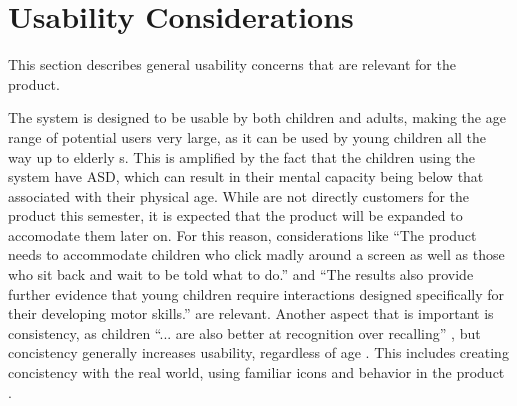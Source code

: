 \section{Usability Considerations}
\label{Preanalysis:Usability_for_children}
This section describes general usability concerns that are relevant for the product. \newline

The \giraf[] system is designed to be usable by both children and adults, making the age range of potential users very large, as it can be used by young children all the way up to elderly \guardian[]s. 
This is amplified by the fact that the children using the system have ASD, which can result in their mental capacity being below that associated with their physical age. \newline
While \autists[] are not directly customers for the product this semester, it is expected that the product will be expanded to accomodate them later on. 
For this reason, considerations like "`The product needs to accommodate children who click madly around a screen as well as those who sit back and wait to be told what to do."' \citep{microsoft:usability} and "`The results also provide further evidence that young children require interactions designed specifically for their developing motor skills."' \citep[p. 8]{mousesize} are relevant. 
Another aspect that is important is consistency, as children "`... are also better at recognition over recalling"' \citep{microsoft:usability}, but concistency generally increases usability, regardless of age \citep[page 90]{dieb-book}. 
This includes creating concistency with the real world, using familiar icons and behavior in the product \citep{microsoft:usability}. 